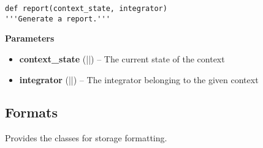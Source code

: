 \begin{description}
\begin{description}
\begin{verbatim}
def report(context_state, integrator)
'''Generate a report.'''
\end{verbatim}

\begin{description}
\item
    \textbf{Parameters}
\begin{itemize}
\item
  \textbf{context\_state} (\VERB||) -- The
  current state of the context
\item
  \textbf{integrator} (\VERB||) -- The
  integrator belonging to the given context
\end{itemize}
\end{description}
\end{description}
\end{description}

\hypertarget{formats}{%
\subsection{Formats}\label{formats}}
Provides the classes for storage formatting.



